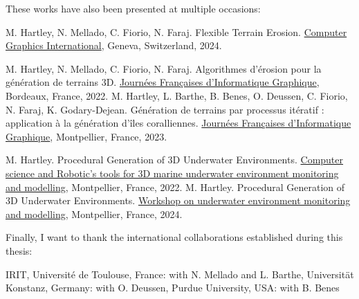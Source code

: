 These works have also been presented at multiple occasions:
\begin{Itemize}
    \Item{} M. Hartley, N. Mellado, C. Fiorio, N. Faraj. Flexible Terrain Erosion. \ul{Computer Graphics International}, Geneva, Switzerland, 2024.
\end{Itemize}
\begin{Itemize}
    \Item{} M. Hartley, N. Mellado, C. Fiorio, N. Faraj. Algorithmes d'érosion pour la génération de terrains 3D. \ul{Journées Françaises d'Informatique Graphique}, Bordeaux, France, 2022.
    \Item{} M. Hartley, L. Barthe, B. Benes, O. Deussen, C. Fiorio, N. Faraj, K. Godary-Dejean. Génération de terrains par processus itératif : application à la génération d'îles coralliennes. \ul{Journées Françaises d'Informatique Graphique}, Montpellier, France, 2023.
\end{Itemize}
\begin{Itemize}
    \Item{} M. Hartley. Procedural Generation of 3D Underwater Environments. \ul{Computer science and Robotic's tools for 3D marine underwater environment monitoring and modelling}, Montpellier, France, 2022.
    \Item{} M. Hartley. Procedural Generation of 3D Underwater Environments. \ul{Workshop on underwater environment monitoring and modelling}, Montpellier, France, 2024.
\end{Itemize}

Finally, I want to thank the international collaborations established during this thesis:
\begin{Itemize}
    \Item{} IRIT, Université de Toulouse, France: with N. Mellado and L. Barthe,
    \Item{} Universität Konstanz, Germany: with O. Deussen,
    \Item{} Purdue University, USA: with B. Benes
\end{Itemize}

